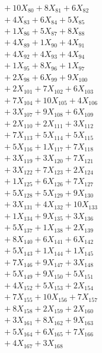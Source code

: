 \documentclass[a4paper,10pt]{article}
\begin{document}
{\begin{align}
&\;  + 10 X_{80} + 8 X_{81} + 6 X_{82} \\[0.3ex]
&\;  + 4 X_{83} + 6 X_{84} + 5 X_{85} \\[0.3ex]
&\;  + 1 X_{86} + 5 X_{87} + 8 X_{88} \\[0.3ex]
&\;  + 4 X_{89} + 1 X_{90} + 4 X_{91} \\[0.3ex]
&\;  + 4 X_{92} + 4 X_{93} + 4 X_{94} \\[0.3ex]
&\;  + 1 X_{95} + 8 X_{96} + 1 X_{97} \\[0.3ex]
&\;  + 2 X_{98} + 6 X_{99} + 9 X_{100} \\[0.5ex]\allowbreak
&\;  + 2 X_{101} + 7 X_{102} + 6 X_{103} \\[0.3ex]
&\;  + 7 X_{104} + 10 X_{105} + 4 X_{106} \\[0.3ex]
&\;  + 3 X_{107} + 9 X_{108} + 6 X_{109} \\[0.3ex]
&\;  + 2 X_{110} + 2 X_{111} + 3 X_{112} \\[0.3ex]
&\;  + 7 X_{113} + 5 X_{114} + 5 X_{115} \\[0.3ex]
&\;  + 5 X_{116} + 1 X_{117} + 7 X_{118} \\[0.3ex]
&\;  + 3 X_{119} + 3 X_{120} + 7 X_{121} \\[0.3ex]
&\;  + 3 X_{122} + 7 X_{123} + 2 X_{124} \\[0.3ex]
&\;  + 1 X_{125} + 6 X_{126} + 7 X_{127} \\[0.3ex]
&\;  + 5 X_{128} + 5 X_{129} + 9 X_{130} \\[0.5ex]\allowbreak
&\;  + 3 X_{131} + 4 X_{132} + 10 X_{133} \\[0.3ex]
&\;  + 1 X_{134} + 9 X_{135} + 3 X_{136} \\[0.3ex]
&\;  + 5 X_{137} + 1 X_{138} + 2 X_{139} \\[0.3ex]
&\;  + 8 X_{140} + 6 X_{141} + 6 X_{142} \\[0.3ex]
&\;  + 5 X_{143} + 1 X_{144} + 1 X_{145} \\[0.3ex]
&\;  + 7 X_{146} + 9 X_{147} + 3 X_{148} \\[0.3ex]
&\;  + 5 X_{149} + 9 X_{150} + 5 X_{151} \\[0.3ex]
&\;  + 4 X_{152} + 5 X_{153} + 2 X_{154} \\[0.3ex]
&\;  + 7 X_{155} + 10 X_{156} + 7 X_{157} \\[0.3ex]
&\;  + 8 X_{158} + 2 X_{159} + 2 X_{160} \\[0.5ex]\allowbreak
&\;  + 3 X_{161} + 8 X_{162} + 9 X_{163} \\[0.3ex]
&\;  + 5 X_{164} + 6 X_{165} + 7 X_{166} \\[0.3ex]
&\;  + 4 X_{167} + 3 X_{168}\nonumber
\end{align}
}
\end{document}
